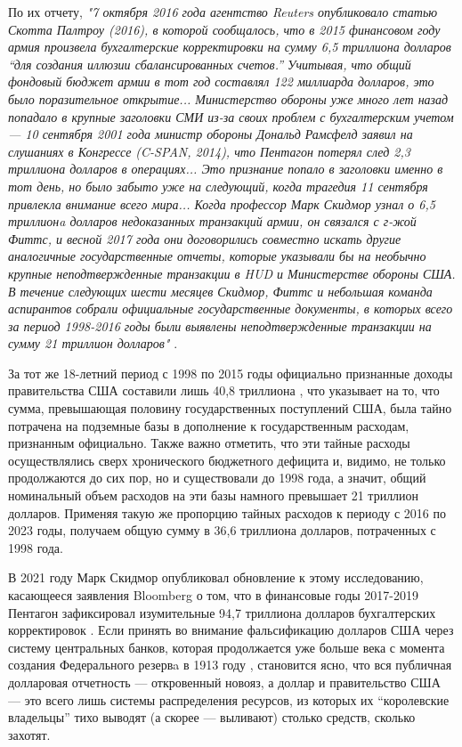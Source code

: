 \documentclass[10pt,twocolumn,letterpaper]{article}
\begin{document}
По их отчету, \textit{"7 октября 2016 года агентство Reuters опубликовало статью Скотта Палтроу (2016), в которой сообщалось, что в 2015 финансовом году армия произвела бухгалтерские корректировки на сумму 6,5 триллиона долларов “для создания иллюзии сбалансированных счетов.” Учитывая, что общий фондовый бюджет армии в тот год составлял 122 миллиарда долларов, это было поразительное открытие... Министерство обороны уже много лет назад попадало в крупные заголовки СМИ из-за своих проблем с бухгалтерским учетом — 10 сентября 2001 года министр обороны Дональд Рамсфелд заявил на слушаниях в Конгрессе (C-SPAN, 2014), что Пентагон потерял след 2,3 триллиона долларов в операциях... Это признание попало в заголовки именно в тот день, но было забыто уже на следующий, когда трагедия 11 сентября привлекла внимание всего мира... Когда профессор Марк Скидмор узнал о 6,5 триллионa долларов недоказанных транзакций армии, он связался с г-жой Фиттс, и весной 2017 года они договорились совместно искать другие аналогичные государственные отчеты, которые указывали бы на необычно крупные неподтвержденные транзакции в HUD и Министерстве обороны США. В течение следующих шести месяцев Скидмор, Фиттс и небольшая команда аспирантов собрали официальные государственные документы, в которых всего за период 1998-2016 годы были выявлены неподтвержденные транзакции на сумму 21 триллион долларов"} \cite{12}.

За тот же 18-летний период с 1998 по 2015 годы официально признанные доходы правительства США составили лишь 40,8 триллиона \cite{15}, что указывает на то, что сумма, превышающая половину государственных поступлений США, была тайно потрачена на подземные базы в дополнение к государственным расходам, признанным официально. Также важно отметить, что эти тайные расходы осуществлялись сверх хронического бюджетного дефицита и, видимо, не только продолжаются до сих пор, но и существовали до 1998 года, а значит, общий номинальный объем расходов на эти базы намного превышает 21 триллион долларов. Применяя такую же пропорцию тайных расходов к периоду с 2016 по 2023 годы, получаем общую сумму в 36,6 триллиона долларов, потраченных с 1998 года.

В 2021 году Марк Скидмор опубликовал обновление к этому исследованию, касающееся заявления Bloomberg о том, что в финансовые годы 2017-2019 Пентагон зафиксировал изумительные 94,7 триллиона долларов бухгалтерских корректировок \cite{17,18}. Если принять во внимание фальсификацию долларов США через систему центральных банков, которая продолжается уже больше века с момента создания Федерального резервa в 1913 году \cite{37}, становится ясно, что вся публичная долларовая отчетность — откровенный новояз, а доллар и правительство США — это всего лишь системы распределения ресурсов, из которых их “королевские владельцы” тихо выводят (а скорее — выливают) столько средств, сколько захотят.
\end{document}
